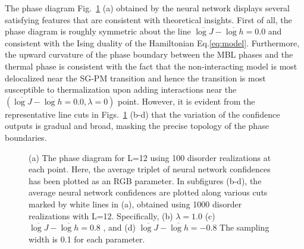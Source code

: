 \documentclass[amsmath,amssymb, aps, prb, superscriptaddress,twocolumn]{revtex4-1}
\begin{document}
The phase diagram Fig.~\ref{fig:PhaseDiagram} (a) obtained by the neural network displays several satisfying features that are consistent with theoretical insights. First of all, the phase diagram is  roughly symmetric about the line $\overline{\log J} - \overline{\log h} = 0.0$ and consistent with the Ising duality of the Hamiltonian Eq.\eqref{eq:model}.
Furthermore, the upward curvature of the phase boundary between the MBL phases and the thermal phase is 
consistent with the fact that the non-interacting model is most delocalized near the SG-PM transition\cite{Fisher95} and hence the transition is most susceptible to thermalization upon adding interactions near the $(\overline{\log J} - \overline{\log h} = 0.0, \lambda=0)$ point. 
However, it is evident from the representative line cuts in Figs.~\ref{fig:PhaseDiagram} (b-d) that the variation of the confidence outputs is gradual and broad, masking the precise topology of the phase boundaries.


\begin{figure}[ht]
\centering
\vspace{10pt}
\caption{(a) The phase diagram for L=12 using 100 disorder realizations at each point. Here, the average triplet of neural network confidences has been plotted as an RGB parameter. 
In subfigures  
(b-d), the average neural network confidences are plotted along various cuts marked by white lines in (a), obtained using 1000 disorder realizations with L=12. Specifically, (b) $\lambda = 1.0$ (c) $\overline{\log J} - \overline{\log h} = 0.8$ , and (d) $\overline{\log J} - \overline{\log h} = -0.8$  The sampling width is 0.1 for each parameter. }
\label{fig:PhaseDiagram}
\end{figure}
\end{document}
